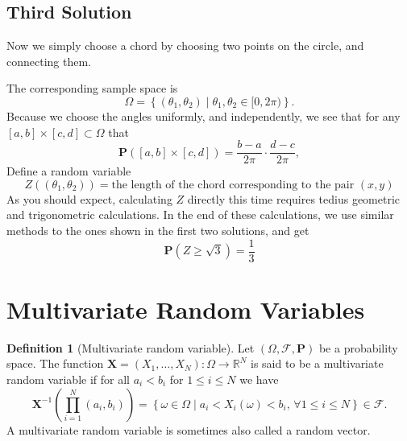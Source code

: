 \documentclass[11pt,a4paper]{article}
\theoremstyle{definition}
\newtheorem{definition}{Definition}[section]
\theoremstyle{plain}
\newcommand{\R}{\mathbb{R}}
\newcommand{\Prob}{\mathbf{P}}
\newcommand{\set}[2]{ \left\{ #1 \mid #2 \right\} }
\renewcommand{\vec}[1]{\boldsymbol{\mathbf{#1}}}
\begin{document}
  \subsection{Third Solution}
    Now we simply choose a chord by choosing two points on the circle, and
    connecting them.
    \begin{center}
    \end{center}
    The corresponding sample space is
    \[
      \Omega = \set{(\theta_1, \theta_2)}{\theta_1, \theta_2 \in [0,2 \pi)}.
    \]
    Because we choose the angles uniformly, and independently,
    we see that for any
    $[a,b] \times [c,d] \subset \Omega$ that
    \[
      \Prob([a,b] \times [c,d]) =
      \frac{b-a}{2 \pi} \cdot \frac{d-c}{2 \pi},
    \]
    Define a random variable
    \[
      Z\left((\theta_1, \theta_2)\right) = 
      \text{the length of the chord corresponding to the pair $(x, y)$}
    \]
    As you should expect, calculating $Z$ directly this time requires
    tedius geometric and trigonometric calculations.
    In the end of these calculations, we use similar methods to the ones
    shown in the first two solutions, and get
    \[
      \Prob\left(Z \geq \sqrt{3}\right) = 
      \frac{1}{3}
    \]

  \newpage

  \section{Multivariate Random Variables}
  \begin{definition}[Multivariate random variable]
    Let $(\Omega, \mathcal F, \Prob)$ be a probability space.
    The function $\vec{X} = (X_1,\dots,X_N) \colon \Omega \to \R^N$ is said
    to be a multivariate random variable if for all $a_i < b_i$ for 
    $1 \le i \le N$ we have
    \[
      \vec{X}^{-1}\left(\prod_{i=1}^{N} (a_i, b_i)\right) =
      \set{\omega \in \Omega}
      {a_i < X_i(\omega) < b_i,\, \forall 1 \le i \le N} \in
      \mathcal F.
    \]
    A multivariate random variable is sometimes also called a random vector.
  \end{definition}
  
\end{document}
